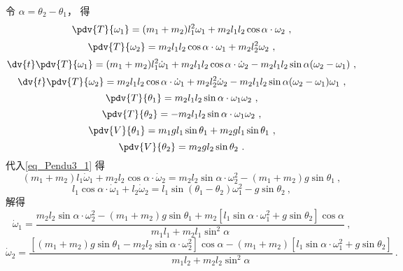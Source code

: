 令 $\alpha = \theta_2-\theta_1$， 得
\begin{equation}
\pdv{T}{\omega_1} = (m_1 + m_2)l_1^2\omega_1 + m_2l_1l_2\cos\alpha\cdot\omega_2~,
\end{equation}
\begin{equation}
\pdv{T}{\omega_2} = m_2l_1l_2\cos\alpha\cdot\omega_1 + m_2l_2^2\omega_2~,
\end{equation}
\begin{equation}
\dv{t}\pdv{T}{\omega_1} = (m_1 + m_2)l_1^2\dot\omega_1 + m_2l_1l_2\cos\alpha\cdot\dot\omega_2 - m_2l_1l_2\sin\alpha(\omega_2-\omega_1)~,
\end{equation}
\begin{equation}
\dv{t}\pdv{T}{\omega_2} = m_2l_1l_2\cos\alpha\cdot\dot\omega_1 + m_2l_2^2\dot\omega_2 -m_2l_1l_2\sin\alpha(\omega_2-\omega_1)\omega_1~,
\end{equation}
\begin{equation}
\pdv{T}{\theta_1} = m_2l_1l_2\sin\alpha\cdot \omega_1\omega_2~,
\end{equation}
\begin{equation}
\pdv{T}{\theta_2} = -m_2l_1l_2\sin\alpha\cdot \omega_1\omega_2~,
\end{equation}
\begin{equation}
\pdv{V}{\theta_1} = m_1gl_1\sin\theta_1 + m_2gl_1\sin\theta_1~,
\end{equation}
\begin{equation}
\pdv{V}{\theta_2} = m_2gl_2\sin\theta_2~.
\end{equation}
代入\autoref{eq_Pendu3_1} 得
\begin{equation}
(m_1+m_2)l_1\dot\omega_1 + m_2l_2\cos\alpha\cdot\dot\omega_2 = m_2l_2\sin\alpha\cdot\omega_2^2 - (m_1+m_2)g\sin\theta_1~,
\end{equation}
\begin{equation}
l_1\cos\alpha\cdot\dot\omega_1 + l_2\dot\omega_2 = l_1\sin(\theta_1-\theta_2)\omega_1^2 - g\sin\theta_2~,
\end{equation}
解得
\begin{equation}
\dot\omega_1 = \frac{m_2l_2\sin\alpha\cdot\omega_2^2 - (m_1+m_2)g\sin\theta_1 + m_2[l_1\sin\alpha\cdot\omega_1^2 + g\sin\theta_2] \cos\alpha}{m_1l_1 + m_2l_1\sin^2\alpha}~,
\end{equation}
\begin{equation}
\dot\omega_2 = \frac{[(m_1+m_2)g\sin\theta_1 - m_2l_2\sin\alpha\cdot\omega_2^2]\cos\alpha - (m_1+m_2)[l_1\sin\alpha\cdot\omega_1^2 + g\sin\theta_2]}{m_1l_2 + m_2l_2\sin^2\alpha}~.
\end{equation}

